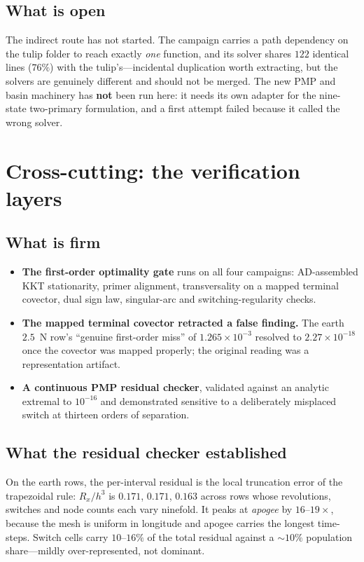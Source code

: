 \documentclass[11pt]{article}
\begin{document}
\subsection{What is open}

The indirect route has not started. The campaign carries a path dependency on
the tulip folder to reach exactly \emph{one} function, and its solver shares
$122$ identical lines ($76\%$) with the tulip's---incidental duplication worth
extracting, but the solvers are genuinely different and should not be merged.
The new PMP and basin machinery has \textbf{not} been run here: it needs its
own adapter for the nine-state two-primary formulation, and a first attempt
failed because it called the wrong solver.

\section{Cross-cutting: the verification layers}

\subsection{What is firm}

\begin{itemize}
  \item \textbf{The first-order optimality gate} runs on all four campaigns:
  AD-assembled KKT stationarity, primer alignment, transversality on a mapped
  terminal covector, dual sign law, singular-arc and switching-regularity
  checks.
  \item \textbf{The mapped terminal covector retracted a false finding.} The
  earth $2.5$~N row's ``genuine first-order miss'' of $1.265\times10^{-3}$
  resolved to $2.27\times10^{-18}$ once the covector was mapped properly; the
  original reading was a representation artifact.
  \item \textbf{A continuous PMP residual checker}, validated against an
  analytic extremal to $10^{-16}$ and demonstrated sensitive to a deliberately
  misplaced switch at thirteen orders of separation.
\end{itemize}

\subsection{What the residual checker established}

On the earth rows, the per-interval residual is the local truncation error of
the trapezoidal rule: $R_x/h^3$ is $0.171$, $0.171$, $0.163$ across rows whose
revolutions, switches and node counts each vary ninefold. It peaks at
\emph{apogee} by $16$--$19\times$, because the mesh is uniform in longitude and
apogee carries the longest time-steps. Switch cells carry $10$--$16\%$ of the
total residual against a $\sim\!10\%$ population share---mildly
over-represented, not dominant.
\end{document}
